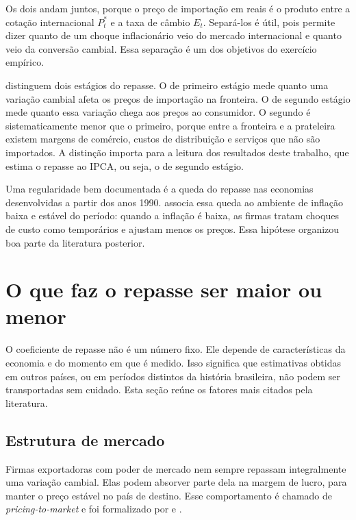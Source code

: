 \documentclass[12pt,openright,oneside,a4paper,portuguese,brazil]{abntex2}
\begin{document}
Os dois andam juntos, porque o preço de importação em reais é o produto entre
a cotação internacional $P^{*}_{t}$ e a taxa de câmbio $E_{t}$. Separá-los é
útil, pois permite dizer quanto de um choque inflacionário veio do mercado
internacional e quanto veio da conversão cambial. Essa separação é um dos
objetivos do exercício empírico.

 distinguem dois estágios do repasse. O de primeiro
estágio mede quanto uma variação cambial afeta os preços de importação na
fronteira. O de segundo estágio mede quanto essa variação chega aos preços ao
consumidor. O segundo é sistematicamente menor que o primeiro, porque entre a
fronteira e a prateleira existem margens de comércio, custos de distribuição e
serviços que não são importados. A distinção importa para a leitura dos
resultados deste trabalho, que estima o repasse ao IPCA, ou seja, o de segundo
estágio.

Uma regularidade bem documentada é a queda do repasse nas economias
desenvolvidas a partir dos anos 1990.  associa essa queda
ao ambiente de inflação baixa e estável do período: quando a inflação é baixa,
as firmas tratam choques de custo como temporários e ajustam menos os preços.
Essa hipótese organizou boa parte da literatura posterior.

\section{O que faz o repasse ser maior ou menor}
\label{sec:determinantes}

O coeficiente de repasse não é um número fixo. Ele depende de características da
economia e do momento em que é medido. Isso significa que estimativas obtidas em
outros países, ou em períodos distintos da história brasileira, não podem ser
transportadas sem cuidado. Esta seção reúne os fatores mais citados pela
literatura.

\subsection{Estrutura de mercado}
\label{sec:ptm}

Firmas exportadoras com poder de mercado nem sempre repassam integralmente uma
variação cambial. Elas podem absorver parte dela na margem de lucro, para manter
o preço estável no país de destino. Esse comportamento é chamado de
\textit{pricing-to-market} e foi formalizado por  e
.
\end{document}
